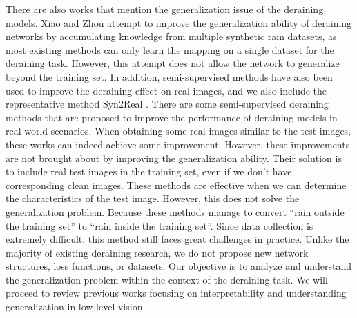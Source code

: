 There are also works that mention the generalization issue of the deraining models.
%
Xiao \etal \cite{xiao2021improving} and Zhou \etal \cite{zhou2021image} attempt to improve the generalization ability of deraining networks by accumulating knowledge from multiple synthetic rain datasets, as most existing methods can only learn the mapping on a single dataset for the deraining task.
%
However, this attempt does not allow the network to generalize beyond the training set.
%
In addition, semi-supervised methods \cite{wei2019semi,huang2021memory} have also been used to improve the deraining effect on real images, and we also include the representative method Syn2Real \cite{yasarla2020syn2real,yasarla2021semi}.
%
There are some semi-supervised deraining methods \cite{wei2019semi,huang2021memory,yasarla2020syn2real,yasarla2021semi} that are proposed to improve the performance of deraining models in real-world scenarios.
%
When obtaining some real images similar to the test images, these works can indeed achieve some improvement. 
%
However, these improvements are not brought about by improving the generalization ability.
%
Their solution is to include real test images in the training set, even if we don't have corresponding clean images. 
%
These methods are effective when we can determine the characteristics of the test image. 
%
However, this does not solve the generalization problem. 
%
Because these methods manage to convert ``rain outside the training set'' to ``rain inside the training set''. 
%
Since data collection is extremely difficult, this method still faces great challenges in practice.
%
Unlike the majority of existing deraining research, we do not propose new network structures, loss functions, or datasets.
%
Our objective is to analyze and understand the generalization problem within the context of the deraining task.
%
We will proceed to review previous works focusing on interpretability and understanding generalization in low-level vision.


